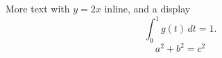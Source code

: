 More text with \(y = 2x\) inline, and a display
\[
  \int_0^1 g(t)\,dt = 1 .
\]
$$ a^2 + b^2 = c^2 $$
